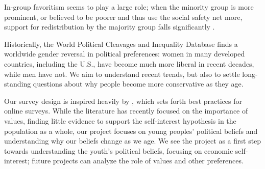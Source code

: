 \documentclass[11pt, headsepline]{article}
\begin{document}

In-group favoritism seems to play a large role; when the minority group is more prominent, or believed to be poorer and thus use the social safety net more, support for redistribution by the majority group falls significantly \citep{fischbacher2023identity, alesina2023immigration}. 

Historically, the World Political Cleavages and Inequality Database \citep{gethin2022political} finds a worldwide gender reversal in political preferences: women in many developed countries, including the U.S., have become much more liberal in recent decades, while men have not. We aim to understand recent trends, but also to settle long-standing questions about why people become more conservative as they age.

Our survey design is inspired heavily by \cite{stantcheva2023run}, which sets forth best practices for online surveys. While the literature has recently focused on the importance of values, finding little evidence to support the self-interest hypothesis in the population as a whole, our project focuses on young peoples' political beliefs and understanding why our beliefs change as we age. We see the project as a first step towards understanding the youth's political beliefs, focusing on economic self-interest; future projects can analyze the role of values and other preferences.

\newpage


\end{document}
